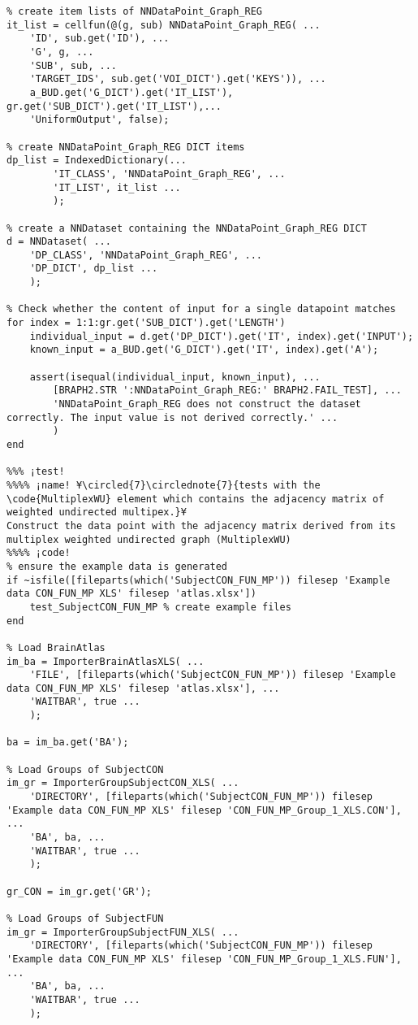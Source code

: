 \documentclass{tufte-handout}
\begin{document}
\begin{lstlisting}
% create item lists of NNDataPoint_Graph_REG
it_list = cellfun(@(g, sub) NNDataPoint_Graph_REG( ...
    'ID', sub.get('ID'), ...
    'G', g, ...
    'SUB', sub, ...
    'TARGET_IDS', sub.get('VOI_DICT').get('KEYS')), ...
    a_BUD.get('G_DICT').get('IT_LIST'), gr.get('SUB_DICT').get('IT_LIST'),...
    'UniformOutput', false);

% create NNDataPoint_Graph_REG DICT items
dp_list = IndexedDictionary(...
        'IT_CLASS', 'NNDataPoint_Graph_REG', ...
        'IT_LIST', it_list ...
        );

% create a NNDataset containing the NNDataPoint_Graph_REG DICT
d = NNDataset( ...
    'DP_CLASS', 'NNDataPoint_Graph_REG', ...
    'DP_DICT', dp_list ...
    );

% Check whether the content of input for a single datapoint matches
for index = 1:1:gr.get('SUB_DICT').get('LENGTH')
    individual_input = d.get('DP_DICT').get('IT', index).get('INPUT');
    known_input = a_BUD.get('G_DICT').get('IT', index).get('A');

    assert(isequal(individual_input, known_input), ...
        [BRAPH2.STR ':NNDataPoint_Graph_REG:' BRAPH2.FAIL_TEST], ...
        'NNDataPoint_Graph_REG does not construct the dataset correctly. The input value is not derived correctly.' ...
        )
end

%%% ¡test!
%%%% ¡name! ¥\circled{7}\circlednote{7}{tests with the \code{MultiplexWU} element which contains the adjacency matrix of weighted undirected multipex.}¥
Construct the data point with the adjacency matrix derived from its multiplex weighted undirected graph (MultiplexWU)
%%%% ¡code!
% ensure the example data is generated
if ~isfile([fileparts(which('SubjectCON_FUN_MP')) filesep 'Example data CON_FUN_MP XLS' filesep 'atlas.xlsx'])
    test_SubjectCON_FUN_MP % create example files
end

% Load BrainAtlas
im_ba = ImporterBrainAtlasXLS( ...
    'FILE', [fileparts(which('SubjectCON_FUN_MP')) filesep 'Example data CON_FUN_MP XLS' filesep 'atlas.xlsx'], ...
    'WAITBAR', true ...
    );

ba = im_ba.get('BA');

% Load Groups of SubjectCON
im_gr = ImporterGroupSubjectCON_XLS( ...
    'DIRECTORY', [fileparts(which('SubjectCON_FUN_MP')) filesep 'Example data CON_FUN_MP XLS' filesep 'CON_FUN_MP_Group_1_XLS.CON'], ...
    'BA', ba, ...
    'WAITBAR', true ...
    );

gr_CON = im_gr.get('GR');

% Load Groups of SubjectFUN
im_gr = ImporterGroupSubjectFUN_XLS( ...
    'DIRECTORY', [fileparts(which('SubjectCON_FUN_MP')) filesep 'Example data CON_FUN_MP XLS' filesep 'CON_FUN_MP_Group_1_XLS.FUN'], ...
    'BA', ba, ...
    'WAITBAR', true ...
    );


\end{lstlisting}
\end{document}
